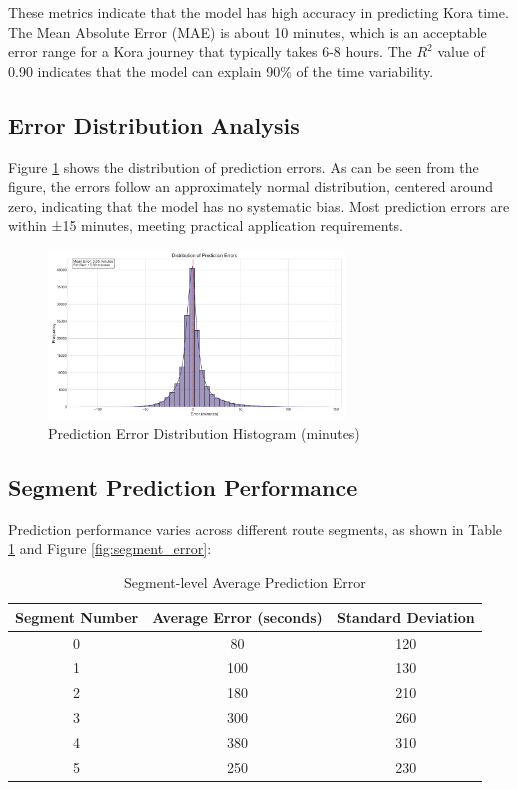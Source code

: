 \documentclass[12pt]{article}
\begin{document}
These metrics indicate that the model has high accuracy in predicting Kora time. The Mean Absolute Error (MAE) is about 10 minutes, which is an acceptable error range for a Kora journey that typically takes 6-8 hours. The $R^2$ value of 0.90 indicates that the model can explain 90\% of the time variability.

\subsection{Error Distribution Analysis}

Figure \ref{fig:error_dist} shows the distribution of prediction errors. As can be seen from the figure, the errors follow an approximately normal distribution, centered around zero, indicating that the model has no systematic bias. Most prediction errors are within ±15 minutes, meeting practical application requirements.

\begin{figure}[H]
\centering
\includegraphics[width=0.7\textwidth]{visualization_results/error_distribution.png}
\caption{Prediction Error Distribution Histogram (minutes)}
\label{fig:error_dist}
\end{figure}

\subsection{Segment Prediction Performance}

Prediction performance varies across different route segments, as shown in Table \ref{tab:segment_error} and Figure \ref{fig:segment_error}:

\begin{table}[H]
\centering
\caption{Segment-level Average Prediction Error}
\label{tab:segment_error}
\begin{tabular}{ccc}
\toprule
Segment Number & Average Error (seconds) & Standard Deviation \\
\midrule
0 & 80 & 120 \\
1 & 100 & 130 \\
2 & 180 & 210 \\
3 & 300 & 260 \\
4 & 380 & 310 \\
5 & 250 & 230 \\
\bottomrule
\end{tabular}
\end{table}
\end{document}
